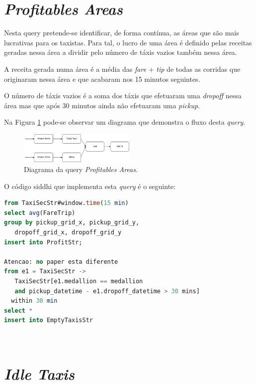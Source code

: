 \documentclass[article]{IEEEtran}
\begin{document}
\section{\textit{Profitables Areas}}

Nesta query pretende-se identificar, de forma contínua, as áreas que são mais lucrativas para os taxistas. Para tal, o lucro de uma área é definido pelas receitas geradas nessa área a dividir pelo número de táxis vazios também nessa área.

A receita gerada numa área é a média das \textit{fare} + \textit{tip} de todas as corridas que originaram nessa área e que acabaram nos 15 minutos seguintes.

O número de táxis vazios é a soma dos táxis que efetuaram uma \textit{dropoff} nessa área mas que após 30 minutos ainda não efetuaram uma \textit{pickup}.

Na Figura \ref{fig:profitablesAreasDiagram} pode-se observar um diagrama que demonstra o fluxo desta \textit{query}.

\begin{figure}[hbtp]
    \centering
        \includegraphics[width=0.5\textwidth]{images/profitableAreasDiagram_v2}
    \caption{Diagrama da query \textit{Profitables Areas}.}
    \label{fig:profitablesAreasDiagram}
\end{figure}

O código siddhi que implementa esta \textit{query} é o seguinte:

\begin{lstlisting}[language=SQL]
from TaxiSecStr#window.time(15 min)
select avg(FareTrip)
group by pickup_grid_x, pickup_grid_y,
   dropoff_grid_x, dropoff_grid_y
insert into ProfitStr;

Atencao: no paper esta diferente
from e1 = TaxiSecStr ->
   TaxiSecStr[e1.medallion == medallion 
   and pickup_datetime - e1.dropoff_datetime > 30 mins]
  within 30 min
select * 
insert into EmptyTaxisStr

 
\end{lstlisting}

\section{\textit{Idle Taxis}}
\end{document}
